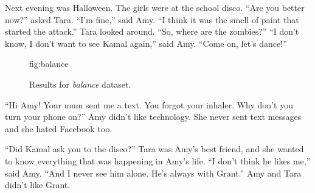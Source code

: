 Next evening was Halloween. The girls were at the school disco. “Are you better now?” asked Tara. “I’m fine,” said Amy. “I think it was the smell of paint that started the attack.” Tara looked around. “So, where are the zombies?” “I don’t know, I don’t want to see Kamal again,” said Amy. “Come on, let’s dance!”




\begin{figure}[htbp]
\floatconts
  {fig:balance}
  {\caption{Results for \textit{balance} dataset.}}
  {%
    \qquad
    \qquad
    \qquad
    \qquad
    \qquad
    \qquad
    \qquad
    \qquad
    \qquad
  }
\end{figure}

“Hi Amy! Your mum sent me a text. You forgot your inhaler. Why don’t you turn your phone on?” Amy didn’t like technology. She never sent text messages and she hated Facebook too.

“Did Kamal ask you to the disco?” Tara was Amy’s best friend, and she wanted to know everything that was happening in Amy’s life. “I don’t think he likes me,” said Amy. “And I never see him alone. He’s always with Grant.” Amy and Tara didn’t like Grant.

